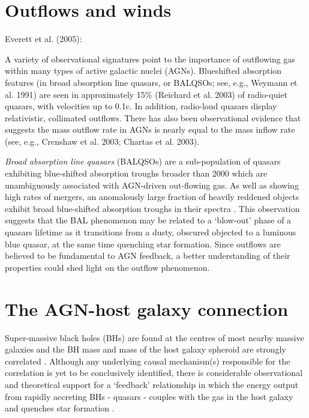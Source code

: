 \section{Outflows and winds}

Everett et al. (2005): 

A variety of observational signatures point to the importance of outflowing gas within many types of active galactic nuclei (AGNs). 
Blueshifted absorption features (in broad absorption line quasars, or BALQSOs; see, e.g., Weymann et al. 1991) are seen in approximately 15\% (Reichard et al. 2003) of radio-quiet quasars, with velocities up to 0.1c. In addition, radio-loud quasars display relativistic, collimated outflows. 
There has also been observational evidence that suggests the mass outflow rate in AGNs is nearly equal to the mass inflow rate (see, e.g., Crenshaw et al. 2003; Chartas et al. 2003).

{\it Broad absorption line quasars} (BALQSOs) are a sub-population of quasars exhibiting blue-shifted absorption troughs broader than 2000 \kms \citep{weymann91} which are unambiguously associated with AGN-driven out-flowing gas. 
As well as showing high rates of mergers, an anomalously large fraction of heavily reddened objects exhibit broad blue-shifted absorption troughs in their spectra \citep{urrutia09, glikman12}. 
This observation suggests that the BAL phenomenon may be related to a `blow-out' phase of a quasars lifetime as it transitions from a dusty, obscured objected to a luminous blue quasar, at the same time quenching star formation. 
Since outflows are believed to be fundamental to AGN feedback, a better understanding of their properties could shed light on the outflow phenomenon. 

\section{The AGN-host galaxy connection}

Super-massive black holes (BHs) are found at the centres of most nearby massive galaxies and the BH mass and mass of the host galaxy spheroid are strongly correlated \citep{ferrarese00,gebhardt00,kormendy13}. 
Although any underlying causal mechanism(s) responsible for the correlation is yet to be conclusively identified, there is considerable observational and theoretical support for a `feedback' relationship in which the energy output from rapidly accreting BHs - quasars - couples with the gas in the host galaxy and quenches star formation \citep[e.g.][]{king15}. 

